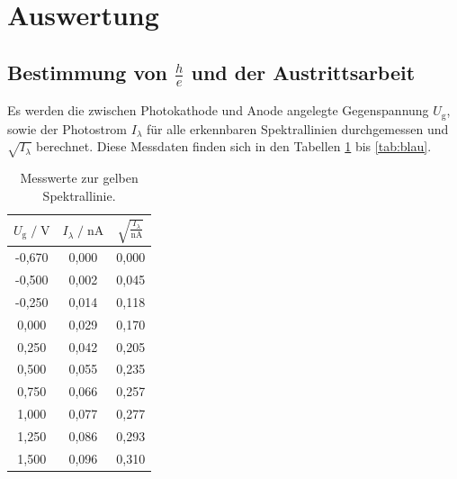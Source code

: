 \section{Auswertung}
\label{sec:Auswertung}

\subsection{Bestimmung von $\frac{h}{e}$ und der Austrittsarbeit}

Es werden die zwischen Photokathode und Anode angelegte Gegenspannung $U_\text{g}$, sowie der 
Photostrom $I_\lambda$ für alle erkennbaren Spektrallinien durchgemessen und $\sqrt{I_\lambda}$ berechnet. 
Diese Messdaten finden sich in den Tabellen \ref{tab:gelb} bis \ref{tab:blau}. 

\begin{table}
    \centering
    \caption{Messwerte zur gelben Spektrallinie.}
    \label{tab:gelb}
    \begin{tabular}{c c c}
    \toprule
    $ U_\text{g} \;/\; \si{\volt} $ & $I_\lambda \;/\; \si{\nano\ampere}$ &
    $ \sqrt{\frac{I_\lambda}{\si{\nano\ampere}}}$\\
    \midrule 
      -0,670 & 0,000 & 0,000\\
      -0,500 & 0,002 & 0,045\\
      -0,250 & 0,014 & 0,118\\
       0,000 & 0,029 & 0,170\\
       0,250 & 0,042 & 0,205\\
       0,500 & 0,055 & 0,235\\
       0,750 & 0,066 & 0,257\\
       1,000 & 0,077 & 0,277\\
       1,250 & 0,086 & 0,293\\
       1,500 & 0,096 & 0,310\\        
    \bottomrule
    \end{tabular}
\end{table}

